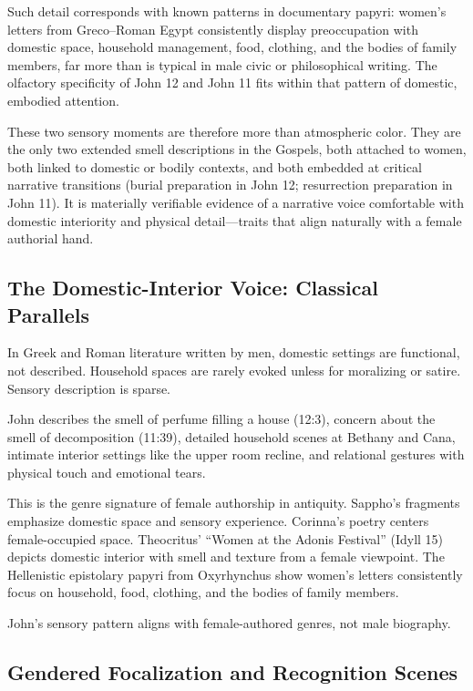 Such detail corresponds with known patterns in documentary papyri: women's letters from Greco--Roman Egypt consistently display preoccupation with domestic space, household management, food, clothing, and the bodies of family members, far more than is typical in male civic or philosophical writing.
The olfactory specificity of John 12 and John 11 fits within that pattern of domestic, embodied attention.

These two sensory moments are therefore more than atmospheric color.
They are the only two extended smell descriptions in the Gospels, both attached to women, both linked to domestic or bodily contexts, and both embedded at critical narrative transitions (burial preparation in John 12; resurrection preparation in John 11).
It is materially verifiable evidence of a narrative voice comfortable with domestic interiority and physical detail---traits that align naturally with a female authorial hand.

\subsection{The Domestic-Interior Voice: Classical Parallels}\label{subsec:domestic-interior-voice}

In Greek and Roman literature written by men, domestic settings are functional, not described.
Household spaces are rarely evoked unless for moralizing or satire.
Sensory description is sparse.

John describes the smell of perfume filling a house (12:3), concern about the smell of decomposition (11:39), detailed household scenes at Bethany and Cana, intimate interior settings like the upper room recline, and relational gestures with physical touch and emotional tears.

This is the genre signature of female authorship in antiquity.
Sappho's fragments emphasize domestic space and sensory experience.
Corinna's poetry centers female-occupied space.
Theocritus' ``Women at the Adonis Festival'' (Idyll 15) depicts domestic interior with smell and texture from a female viewpoint.
The Hellenistic epistolary papyri from Oxyrhynchus show women's letters consistently focus on household, food, clothing, and the bodies of family members.

John's sensory pattern aligns with female-authored genres, not male biography.

\subsection{Gendered Focalization and Recognition Scenes}\label{subsec:gendered-focalization}

